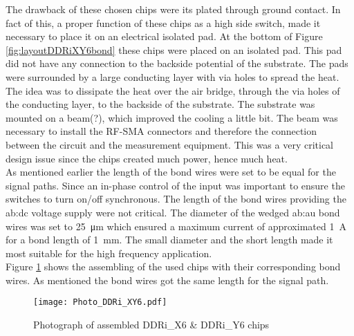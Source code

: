 The drawback of these chosen chips were its plated through ground contact. 
In fact of this, a proper function of these chips as a high side switch, made it necessary to place it on an electrical isolated pad.
At the bottom of Figure \ref{fig:layoutDDRiXY6bond} these chips were placed on an isolated pad.
This pad did not have any connection to the backside potential of the substrate.
The pads were surrounded by a large conducting layer with via holes to spread the heat.
The idea was to dissipate the heat over the air bridge, through the via holes of the conducting layer, to the backside of the substrate.
The substrate was mounted on a beam(?), which improved the cooling a little bit.
The beam was necessary to install the RF-SMA connectors and therefore the connection between the circuit and the measurement equipment.
This was a very critical design issue since the chips created much power, hence much heat.
\\
As mentioned earlier the length of the bond wires were set to be equal for the signal paths.
Since an in-phase control of the input was important to ensure the switches to turn on/off synchronous.
The length of the bond wires providing the \gls{ab:dc} voltage supply were not critical.
The diameter of the wedged \gls{ab:au} bond wires was set to \SI{25}{\micro \metre} which ensured a maximum current of approximated \SI{1}{\ampere} for a bond length of \SI{1}{\milli \metre}.
The small diameter and the short length made it most suitable for the high frequency application.\\
Figure \ref{fig:photoDDRiXY6bond} shows the assembling of the used chips with their corresponding bond wires.
As mentioned the bond wires got the same length for the signal path.


\begin{figure}[htb!]
	\centering
  \texttt{[image: Photo\_DDRi\_XY6.pdf]}
	\caption{Photograph of assembled DDRi\_X6 \& DDRi\_Y6 chips}
	\label{fig:photoDDRiXY6bond}
\end{figure}


